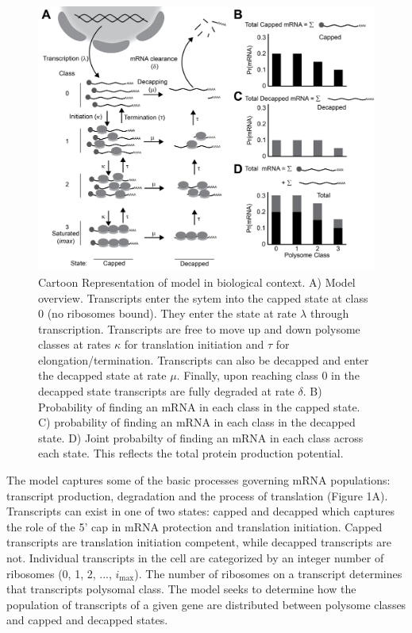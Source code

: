 \documentclass[a4,center,fleqn]{NAR}
\newcommand{\imax}{\ensuremath{{i_{\max}}}\xspace}
\begin{document}
\begin{figure}[!ht]
\begin{center}
\includegraphics[width=120mm]{Images/Figure1_biomodel_V3.png}
\caption{Cartoon Representation of model in biological context. A) Model overview. Transcripts enter the sytem into the capped state at class 0 (no ribosomes bound). They enter the state at rate $\lambda$ through transcription. Transcripts are free to move up and down polysome classes at rates $\kappa$ for translation initiation and $\tau$ for elongation/termination. Transcripts can also be decapped and enter the decapped state at rate $\mu$. Finally, upon reaching class 0 in the decapped state transcripts are fully degraded at rate $\delta$. B) Probability of finding an mRNA in each class in the capped state. C) probability of finding an mRNA in each class in the decapped state. D) Joint probabilty of finding an mRNA in each class across each state. This reflects the total protein production potential.}
\end{center}
\end{figure}


The model captures some of the basic processes governing mRNA populations: transcript production, degradation and the process of translation (Figure 1A).
Transcripts can exist in one of two states: capped and decapped which captures the role of the 5' cap in mRNA protection and translation initiation. 
Capped transcripts are translation initiation competent, while decapped transcripts are not. 
Individual transcripts in the cell are categorized by an integer number of ribosomes (0, 1, 2, ..., \imax).
The number of ribosomes on a transcript determines that transcripts polysomal class.
The model seeks to determine how the population of transcripts of a given gene are distributed between polysome classes and capped and decapped states.
\end{document}
